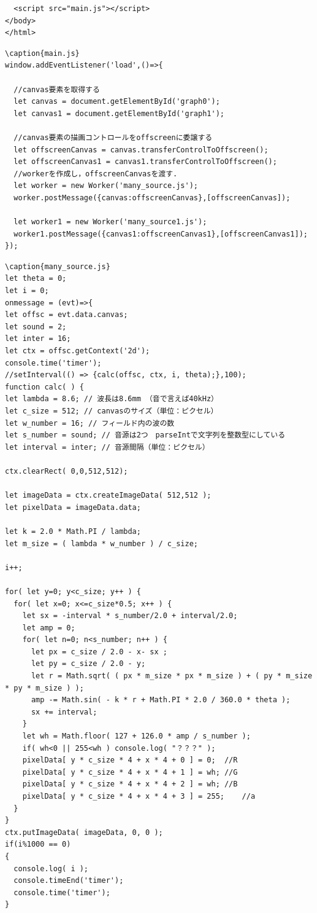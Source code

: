 \documentclass[a4j,12pt]{jsarticle}
\begin{document}
{\begin{lstlisting}
  <script src="main.js"></script>
</body>
</html>

\end{lstlisting}
\newpage

\begin{lstlisting}
\caption{main.js}
window.addEventListener('load',()=>{

  //canvas要素を取得する
  let canvas = document.getElementById('graph0');
  let canvas1 = document.getElementById('graph1');

  //canvas要素の描画コントロールをoffscreenに委譲する
  let offscreenCanvas = canvas.transferControlToOffscreen();
  let offscreenCanvas1 = canvas1.transferControlToOffscreen();
  //workerを作成し，offscreenCanvasを渡す.
  let worker = new Worker('many_source.js');
  worker.postMessage({canvas:offscreenCanvas},[offscreenCanvas]);

  let worker1 = new Worker('many_source1.js');
  worker1.postMessage({canvas1:offscreenCanvas1},[offscreenCanvas1]);
});

\end{lstlisting}
\newpage

\begin{lstlisting}
\caption{many_source.js}
let theta = 0;
let i = 0;
onmessage = (evt)=>{
let offsc = evt.data.canvas;
let sound = 2;
let inter = 16;
let ctx = offsc.getContext('2d');
console.time('timer');
//setInterval(() => {calc(offsc, ctx, i, theta);},100);
function calc( ) {
let lambda = 8.6; // 波長は8.6mm （音で言えば40kHz）
let c_size = 512; // canvasのサイズ（単位：ピクセル）
let w_number = 16; // フィールド内の波の数
let s_number = sound; // 音源は2つ　parseIntで文字列を整数型にしている
let interval = inter; // 音源間隔（単位：ピクセル）

ctx.clearRect( 0,0,512,512);

let imageData = ctx.createImageData( 512,512 );
let pixelData = imageData.data;

let k = 2.0 * Math.PI / lambda;
let m_size = ( lambda * w_number ) / c_size;

i++;

for( let y=0; y<c_size; y++ ) {
  for( let x=0; x<=c_size*0.5; x++ ) {
    let sx = -interval * s_number/2.0 + interval/2.0;
    let amp = 0;
    for( let n=0; n<s_number; n++ ) {
      let px = c_size / 2.0 - x- sx ;
      let py = c_size / 2.0 - y;
      let r = Math.sqrt( ( px * m_size * px * m_size ) + ( py * m_size * py * m_size ) );
      amp -= Math.sin( - k * r + Math.PI * 2.0 / 360.0 * theta );
      sx += interval;
    }
    let wh = Math.floor( 127 + 126.0 * amp / s_number );
    if( wh<0 || 255<wh ) console.log( "？？？" );
    pixelData[ y * c_size * 4 + x * 4 + 0 ] = 0;  //R
    pixelData[ y * c_size * 4 + x * 4 + 1 ] = wh; //G
    pixelData[ y * c_size * 4 + x * 4 + 2 ] = wh; //B
    pixelData[ y * c_size * 4 + x * 4 + 3 ] = 255;    //a
  }
}
ctx.putImageData( imageData, 0, 0 );
if(i%1000 == 0)
{
  console.log( i );
  console.timeEnd('timer');
  console.time('timer');
}


\end{lstlisting}}
\end{document}
